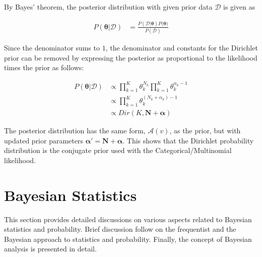 By Bayes' theorem, the posterior distribution with given prior data $\boldsymbol{\mathcal{D}}$ is given as

\begin{equation}
      \label{eq:probability:conjugate_priors:mult_likelihood:posterior}
      \begin{split}
            P(\boldsymbol{\theta} \vert \boldsymbol{\mathcal{D}}) &= \frac{P(\boldsymbol{\mathcal{D}} \vert \boldsymbol{\theta}) P(\boldsymbol{\theta)}}{P(\boldsymbol{\mathcal{D}})}
      \end{split}
\end{equation}

Since the denominator sums to $1$, the denominator and constants for the Dirichlet prior can be removed by expressing the posterior as proportional to the likelihood times the prior as follows:

\begin{equation}
      \label{eq:probability:conjugate_priors:mult_likelihood:posterior_propto}
      \begin{split}
            P(\boldsymbol{\theta} \vert \boldsymbol{\mathcal{D}}) &\propto \prod_{k=1}^{K} \theta_{k}^{N_{k}} \prod_{k=1}^{K} \theta_{k}^{\alpha_{k} - 1}\\
            &\propto \prod_{k=1}^{K} \theta_{k}^{(N_{k} + \alpha_{k}) - 1} \\
            &\propto Dir(K, \boldsymbol{N} + \boldsymbol{\alpha})
      \end{split}
\end{equation}

The posterior distribution has the same form, $\mathcal{A}(v)$, as the prior, but with updated prior parameters $\boldsymbol{\alpha'} = \boldsymbol{N} + \boldsymbol{\alpha}$. This shows that the Dirichlet probability distribution is the conjugate prior used with the Categorical/Multinomial likelihood.

\section{Bayesian Statistics}
\label{sec:probability:bayesian_statistics}

This section provides detailed discussions on various aspects related to Bayesian statistics and probability. Brief discussion follow on the frequentist and the Bayesian approach to statistics and probability. Finally, the concept of Bayesian analysis is presented in detail.

